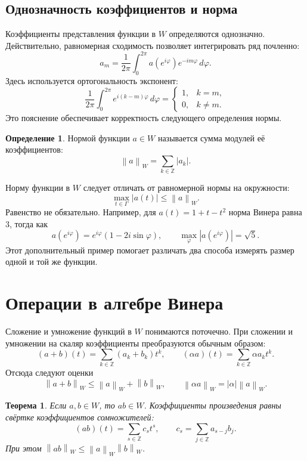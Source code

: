 \documentclass[12pt,a4paper]{article}
\newtheorem{theorem}{Теорема}
\theoremstyle{definition}
\newtheorem{definition}{Определение}
\theoremstyle{remark}
\newcommand{\ZZ}{\mathbb{Z}}
\newcommand{\norm}[1]{\left\lVert #1\right\rVert}
\begin{document}
\subsection{Однозначность коэффициентов и норма}

Коэффициенты представления функции в $W$ определяются однозначно.
Действительно, равномерная сходимость позволяет интегрировать ряд
почленно:
\[
  \boxed{a_m=\frac1{2\pi}\int_0^{2\pi}
      a(e^{i\varphi})e^{-im\varphi}\,d\varphi}.
\]
Здесь используется ортогональность экспонент:
\[
  \frac1{2\pi}\int_0^{2\pi}e^{i(k-m)\varphi}\,d\varphi
  =\begin{cases}1,&k=m,\\0,&k\ne m.\end{cases}
\]
Это пояснение обеспечивает корректность следующего определения нормы.

\begin{definition}
Нормой функции $a\in W$ называется сумма модулей её коэффициентов:
\[
  \boxed{\norm{a}_W=\sum_{k\in\ZZ}|a_k|}.
\]
\end{definition}

Норму функции в $W$ следует отличать от равномерной нормы на окружности:
\[
  \max_{t\in\Gamma}|a(t)|\leqslant\norm{a}_W.
\]
Равенство не обязательно. Например, для $a(t)=1+t-t^2$ норма Винера
равна $3$, тогда как
\[
  a(e^{i\varphi})=e^{i\varphi}(1-2i\sin\varphi),\qquad
  \max_\varphi|a(e^{i\varphi})|=\sqrt5.
\]
Этот дополнительный пример помогает различать два способа измерять
размер одной и той же функции.

\section{Операции в алгебре Винера}

Сложение и умножение функций в $W$ понимаются поточечно. При сложении
и умножении на скаляр коэффициенты преобразуются обычным образом:
\[
  (a+b)(t)=\sum_{k\in\ZZ}(a_k+b_k)t^k,\qquad
  (\alpha a)(t)=\sum_{k\in\ZZ}\alpha a_kt^k.
\]
Отсюда следуют оценки
\[
  \norm{a+b}_W\leqslant\norm{a}_W+\norm{b}_W,\qquad
  \norm{\alpha a}_W=|\alpha|\norm{a}_W.
\]

\begin{theorem}
Если $a,b\in W$, то $ab\in W$. Коэффициенты произведения равны свёртке
коэффициентов сомножителей:
\[
  (ab)(t)=\sum_{s\in\ZZ}c_st^s,\qquad
  \boxed{c_s=\sum_{j\in\ZZ}a_{s-j}b_j}.
\]
При этом $\norm{ab}_W\leqslant\norm{a}_W\norm{b}_W$.
\end{theorem}
\end{document}
